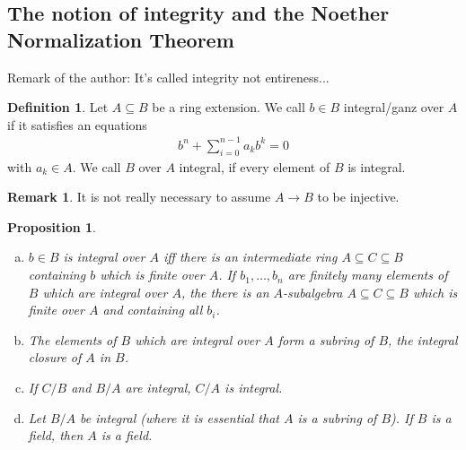 \documentclass[DIV=14,parskip=half]{scrartcl}
\newtheorem{prop}{Proposition}[subsection]
\theoremstyle{definition}
\newtheorem{defi}{Definition}[subsection]
\newtheorem{rem}{Remark}[subsection]
\newcommand{\ldotspam}{,\ldots,}
\begin{document}
\subsection{The notion of integrity and the Noether Normalization Theorem}
Remark of the author: It's called integrity not entireness...
\begin{defi}\label{def:integrity}
 Let $A\subseteq B$ be a ring extension. We call $b\in B$ integral/ganz over $A$ if it satisfies an equations
 \begin{align*}
  b^n +\sum_{i=0}^{n-1} a_kb^k =0
 \end{align*}
 with $a_k\in A$. We call $B$ over $A$ integral, if every element of $B$ is integral.
\end{defi}
\begin{rem}
 It is not really necessary to assume $A\to B$ to be injective.
\end{rem}
\begin{prop}\label{prop:integralStuff}
 \begin{enumerate}[a)]
  \item $b\in B$ is integral over $A$ iff there is an intermediate ring $A\subseteq C\subseteq B$ containing $b$ which is finite over $A$. If $b_1\ldotspam b_n$ are finitely many elements of $B$ which are integral over $A$, the there is an $A$-subalgebra $A\subseteq C\subseteq B$ which is finite over $A$ and containing all $b_i$.
  \item The elements of $B$ which are integral over $A$ form a subring of $B$, the integral closure of $A$ in $B$.
  \item If $C/B$ and $B/A$ are integral, $C/A$ is integral.
  \item Let $B/A$ be integral (where it is essential that $A$ is a subring of $B$). If $B$ is a field, then $A$ is a field.
 \end{enumerate}

\end{prop}
\end{document}

